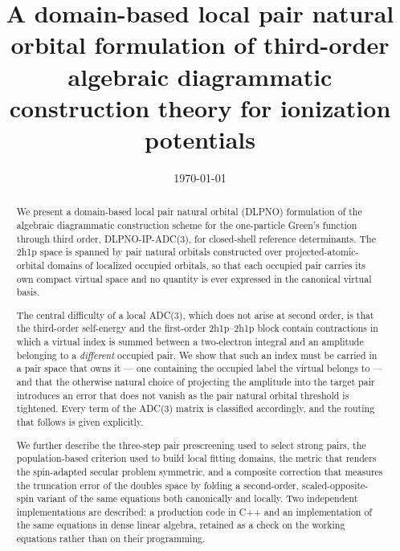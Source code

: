 \documentclass[aip,jcp,amsmath,amssymb,preprint,superscriptaddress]{revtex4-2}%
\newcommand{\affiliation}[1]{}
\begin{document}
\title{A domain-based local pair natural orbital formulation of third-order
       algebraic diagrammatic construction theory for ionization potentials}

\author{}
\affiliation{Department of Chemistry, Indian Institute of Technology Bombay,
             Powai, Mumbai 400076, India}

\date{\today}

\begin{abstract}
We present a domain-based local pair natural orbital (DLPNO) formulation of
the algebraic diagrammatic construction scheme for the one-particle Green's
function through third order, DLPNO-IP-ADC(3), for closed-shell reference
determinants. The 2h1p space is spanned by pair natural orbitals constructed
over projected-atomic-orbital domains of localized occupied orbitals, so that
each occupied pair carries its own compact virtual space and no quantity is
ever expressed in the canonical virtual basis.

The central difficulty of a local ADC(3), which does not arise at second
order, is that the third-order self-energy and the first-order 2h1p--2h1p
block contain contractions in which a virtual index is summed between a
two-electron integral and an amplitude belonging to a \emph{different} occupied
pair. We show that such an index must be carried in a pair space that owns it
--- one containing the occupied label the virtual belongs to --- and that the
otherwise natural choice of projecting the amplitude into the target pair
introduces an error that does not vanish as the pair natural orbital threshold
is tightened. Every term of the ADC(3) matrix is classified accordingly, and
the routing that follows is given explicitly.

We further describe the three-step pair prescreening used to select strong
pairs, the population-based criterion used to build local fitting domains, the
metric that renders the spin-adapted secular problem symmetric, and a
composite correction that measures the truncation error of the doubles space
by folding a second-order, scaled-opposite-spin variant of the same equations
both canonically and locally. Two independent implementations are described:
a production code in C++ and an implementation of the same equations in dense
linear algebra, retained as a check on the working equations rather than on
their programming.
\end{abstract}

\maketitle
\end{document}
